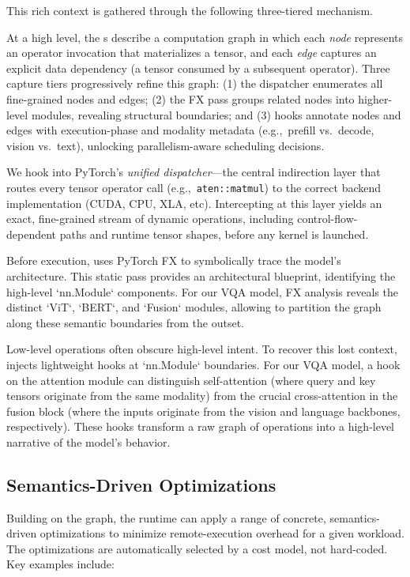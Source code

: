 \noindent
This rich context is gathered through the following three-tiered mechanism.

At a high level, the \lazytensor{}s describe a computation graph in which each \emph{node} represents an operator invocation that materializes a tensor, 
and each \emph{edge} captures an explicit data dependency (a tensor consumed by a subsequent operator). 
Three capture tiers progressively refine this graph: 
(1) the dispatcher enumerates all fine-grained nodes and edges; 
(2) the FX pass groups related nodes into higher-level modules, revealing structural boundaries; and 
(3) hooks annotate nodes and edges with execution-phase and modality metadata (e.g.,~prefill vs.~decode, vision vs.~text), unlocking parallelism-aware scheduling decisions.

     We hook into 
    PyTorch's \emph{unified dispatcher}---the central indirection layer that routes every tensor operator call (e.g.,\ \texttt{aten::matmul}) to the correct backend implementation (CUDA, CPU, XLA, etc). 
    Intercepting at this layer yields an exact, fine-grained stream of dynamic operations, including control-flow-dependent paths and runtime tensor shapes, before any kernel is launched.

     Before execution, \sys uses PyTorch FX to symbolically trace the model's architecture. This static pass provides an architectural blueprint, identifying the high-level `nn.Module` components. For our VQA model, FX analysis reveals the distinct `ViT`, `BERT`, and `Fusion` modules, allowing \sys to partition the graph along these semantic boundaries from the outset.

     Low-level operations often obscure high-level intent. To recover this lost context, \sys injects lightweight hooks at `nn.Module` boundaries. For our VQA model, a hook on the attention module can distinguish self-attention (where query and key tensors originate from the same modality) from the crucial cross-attention in the fusion block (where the inputs originate from the vision and language backbones, respectively). These hooks transform a raw graph of operations into a high-level narrative of the model's behavior.

\subsection{Semantics-Driven Optimizations}
\label{ssec:optimization}
Building on the \lazytensor{} graph, the \sys{} runtime can apply a range of concrete, semantics-driven optimizations to minimize remote-execution overhead for a given workload. The optimizations are automatically selected by a cost model, not hard-coded. Key examples include:

